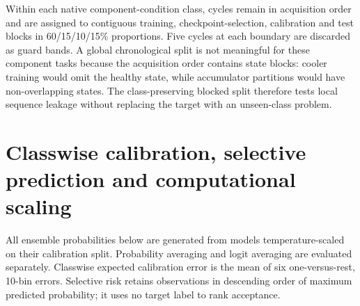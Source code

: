 \documentclass[10pt]{article}
\begin{document}
Within each native component-condition class, cycles remain in acquisition order and are assigned to contiguous training, checkpoint-selection, calibration and test blocks in 60/15/10/15\% proportions. Five cycles at each boundary are discarded as guard bands. A global chronological split is not meaningful for these component tasks because the acquisition order contains state blocks: cooler training would omit the healthy state, while accumulator partitions would have non-overlapping states. The class-preserving blocked split therefore tests local sequence leakage without replacing the target with an unseen-class problem.

\begin{table}[ht]
\centering
\caption{RO-PDRF-Full minus RO-CAGF affected-AUROC under the guarded within-condition blocked split.}
\resizebox{0.58\textwidth}{!}{}
\end{table}

\begin{table}[ht]
\centering
\caption{Earlier random-stratified hydraulic sensitivity analysis. These results are not the main hydraulic evidence because adjacent cycles can be allocated across splits.}
\resizebox{0.92\textwidth}{!}{}
\end{table}

\begin{table}[ht]
\centering
\caption{Nearest-training-cycle audit in standardized 240-dimensional hydraulic feature space.}
\resizebox{0.78\textwidth}{!}{}
\end{table}
\FloatBarrier

\section{Classwise calibration, selective prediction and computational scaling}

All ensemble probabilities below are generated from models temperature-scaled on their calibration split. Probability averaging and logit averaging are evaluated separately. Classwise expected calibration error is the mean of six one-versus-rest, 10-bin errors. Selective risk retains observations in descending order of maximum predicted probability; it uses no target label to rank acceptance.

\begin{table}[ht]
\centering
\caption{Chemical fixed-ensemble probability quality under probability and logit averaging.}
\resizebox{0.94\textwidth}{!}{}
\end{table}
\end{document}
